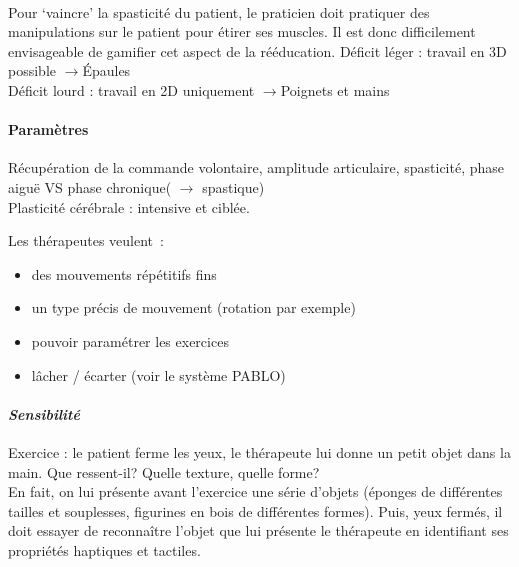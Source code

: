\paragraph{}
Pour ‘vaincre’ la spasticité du patient, le praticien doit pratiquer des manipulations sur le patient pour étirer ses muscles. Il est donc difficilement envisageable de gamifier cet aspect de la rééducation.\newline
Déficit léger : travail en 3D possible     \quad$ \rightarrow $\quad       Épaules\\
Déficit lourd : travail en 2D uniquement  \quad $\rightarrow $\quad      Poignets et mains

	\paragraph{Paramètres\\}
Récupération de la commande volontaire, amplitude articulaire, spasticité, phase aiguë VS phase chronique( $ \rightarrow $ spastique)\\
Plasticité cérébrale : intensive et ciblée. \newline

Les thérapeutes veulent~: 
\begin{itemize}
	\item des mouvements répétitifs fins
	\item un type précis de mouvement (rotation par exemple)
	\item pouvoir paramétrer les exercices
	\item lâcher / écarter (voir le système PABLO)
\end{itemize}

	\paragraph{\emph{Sensibilité} \\ \quad}
Exercice : le patient ferme les yeux, le thérapeute lui donne un petit objet dans la main. Que ressent-il? Quelle texture, quelle forme? \\
En fait, on lui présente avant l’exercice une série d’objets (éponges de différentes tailles et souplesses, figurines en bois de différentes formes). Puis, yeux fermés, il doit essayer de reconnaître l’objet que lui présente le thérapeute en identifiant ses propriétés haptiques et tactiles.

